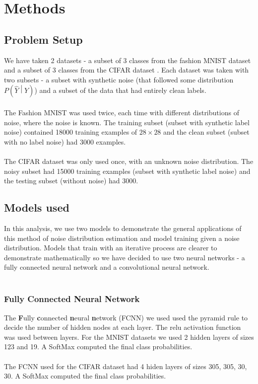 \documentclass{article} %
\newcommand{\PR}[1]{{P\left(#1\right)}}
\newcommand{\Yh}{\widehat{Y}}
\begin{document}
\section{Methods}
\subsection{Problem Setup}
We have taken 2 datasets - a subset of 3 classes from the fashion MNIST dataset \cite{FMNIST} and a subset of 3 classes from the CIFAR dataset \cite{CIFAR}.
Each dataset was taken with two subsets - a subset with synthetic noise (that followed some distribution $\PR{\Yh \middle| Y}$) and a subset of the data that had entirely clean labels.
\\\\
The Fashion MNIST was used twice, each time with different distributions of noise, where the noise is known.
The training subset (subset with synthetic label noise) contained 18000 training examples of $28\times 28$ and the clean subset (subset with no label noise) had 3000 examples.
\\\\
The CIFAR dataset was only used once, with an unknown noise distribution.
The noisy subset had 15000 training examples (subset with synthetic label noise) and the testing subset (without noise) had 3000.
\subsection{Models used}
In this analysis, we use two models to demonstrate the general applications of this method of noise distribution estimation and model training given a noise distribution. Models that train with an iterative process are clearer to demonstrate mathematically so we have decided to use two neural networks - a fully connected neural network and a convolutional neural network.
\\\\
\subsubsection{Fully Connected Neural Network}
The \textbf Fully \textbf connected \textbf neural \textbf network (FCNN) we used used the pyramid rule\cite{PYRAMID_RULE} to decide the number of hidden nodes at each layer. The relu activation function \cite{ReLU} was used between layers.
For the MNIST datasets we used 2 hidden layers of sizes 123 and 19. A SoftMax computed the final class probabilities.
\\\\
The FCNN used for the CIFAR dataset had 4 hiden layers of sizes 305, 305, 30, 30. A SoftMax computed the final class probabilities.
\end{document}
